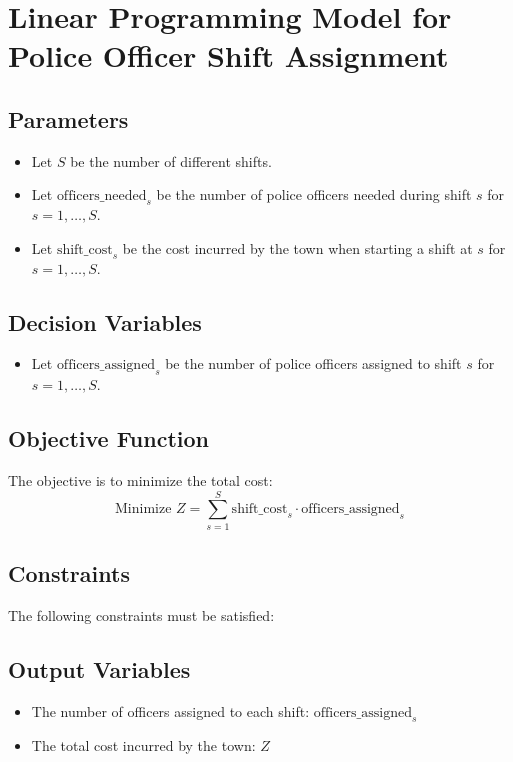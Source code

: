 \documentclass{article}
\begin{document}
\section*{Linear Programming Model for Police Officer Shift Assignment}

\subsection*{Parameters}
\begin{itemize}
    \item Let \( S \) be the number of different shifts.
    \item Let \( \text{officers\_needed}_{s} \) be the number of police officers needed during shift \( s \) for \( s = 1, \ldots, S \).
    \item Let \( \text{shift\_cost}_{s} \) be the cost incurred by the town when starting a shift at \( s \) for \( s = 1, \ldots, S \).
\end{itemize}

\subsection*{Decision Variables}
\begin{itemize}
    \item Let \( \text{officers\_assigned}_{s} \) be the number of police officers assigned to shift \( s \) for \( s = 1, \ldots, S \).
\end{itemize}

\subsection*{Objective Function}
The objective is to minimize the total cost:
\[
\text{Minimize } Z = \sum_{s=1}^{S} \text{shift\_cost}_{s} \cdot \text{officers\_assigned}_{s}
\]

\subsection*{Constraints}
The following constraints must be satisfied:
\]

\subsection*{Output Variables}
\begin{itemize}
    \item The number of officers assigned to each shift: \( \text{officers\_assigned}_{s} \)
    \item The total cost incurred by the town: \( Z \)
\end{itemize}
\end{document}
